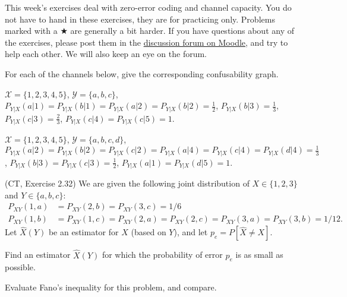 \documentclass[a4paper,10pt,landscape,twocolumn]{scrartcl}
\begin{document}
\practiceproblems

{\sffamily\noindent
This week's exercises deal with zero-error coding and channel capacity. You do not have to hand in these exercises, they are for practicing only. Problems marked with a $\bigstar$ are generally a bit harder. If you have questions about any of the exercises, please post them in the \href{https://www.moodle.ch/lms/mod/forum/view.php?id=1761}{discussion forum on Moodle}, and try to help each other. We will also keep an eye on the forum.
}

\begin{exercise}
For each of the channels below, give the corresponding confusability graph.
	\begin{subex}
	$\mathcal{X} = \{1,2,3,4,5\}$, $\mathcal{Y} = \{a,b,c\}$, $P_{Y|X}(a|1) = P_{Y|X}(b|1) = P_{Y|X}(a|2) = P_{Y|X}(b|2) = \frac{1}{2}$, $P_{Y|X}(b|3) = \frac{1}{3}$, $P_{Y|X}(c|3) = \frac{2}{3}$, $P_{Y|X}(c|4) = P_{Y|X}(c|5) = 1$.
	\end{subex}
	\begin{subex}
	$\mathcal{X} = \{1,2,3,4,5\}$, $\mathcal{Y} = \{a,b,c,d\}$, $P_{Y|X}(a|2) = P_{Y|X}(b|2) = P_{Y|X}(c|2) = P_{Y|X}(a|4) = P_{Y|X}(c|4) = P_{Y|X}(d|4) = \frac{1}{3}$, $P_{Y|X}(b|3) = P_{Y|X}(c|3) = \frac{1}{2}$, $P_{Y|X}(a|1) = P_{Y|X}(d|5) = 1$.
	\end{subex}
\end{exercise}

\begin{exercise}[]
(CT, Exercise 2.32)
We are given the following joint distribution of $X \in \{1,2,3\}$ and $Y \in \{a,b,c\}$:
\begin{align*}
P_{XY}(1,a) &= P_{XY}(2,b) = P_{XY}(3,c) = 1/6\\
P_{XY}(1,b) &= P_{XY}(1,c) = P_{XY}(2,a) = P_{XY}(2,c) = P_{XY}(3,a) = P_{XY}(3,b) = 1/12.
\end{align*}
Let $\hat{X}(Y)$ be an estimator for $X$ (based on $Y$), and let $p_{e} = P[\hat{X} \neq X]$.
	\begin{subex}
	Find an estimator $\hat{X}(Y)$ for which the probability of error $p_e$ is as small as possible.
	\end{subex}
	\begin{subex}
	Evaluate Fano's inequality for this problem, and compare.
	\end{subex}
\end{exercise}
\end{document}
